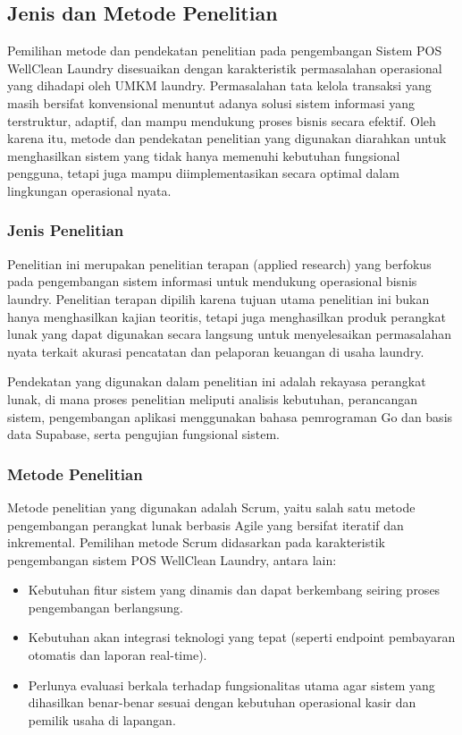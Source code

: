 
\vspace{1cm}
\subsection{Jenis dan Metode Penelitian}
\indent
Pemilihan metode dan pendekatan penelitian pada pengembangan Sistem POS WellClean Laundry disesuaikan dengan karakteristik permasalahan operasional yang dihadapi oleh UMKM laundry. Permasalahan tata kelola transaksi yang masih bersifat konvensional menuntut adanya solusi sistem informasi yang terstruktur, adaptif, dan mampu mendukung proses bisnis secara efektif. Oleh karena itu, metode dan pendekatan penelitian yang digunakan diarahkan untuk menghasilkan sistem yang tidak hanya memenuhi kebutuhan fungsional pengguna, tetapi juga mampu diimplementasikan secara optimal dalam lingkungan operasional nyata.

\subsubsection{Jenis Penelitian}
\indent
Penelitian ini merupakan penelitian terapan (applied research) yang berfokus pada pengembangan sistem informasi untuk mendukung operasional bisnis laundry. Penelitian terapan dipilih karena tujuan utama penelitian ini bukan hanya menghasilkan kajian teoritis, tetapi juga menghasilkan produk perangkat lunak yang dapat digunakan secara langsung untuk menyelesaikan permasalahan nyata terkait akurasi pencatatan dan pelaporan keuangan di usaha laundry.

Pendekatan yang digunakan dalam penelitian ini adalah rekayasa perangkat lunak, di mana proses penelitian meliputi analisis kebutuhan, perancangan sistem, pengembangan aplikasi menggunakan bahasa pemrograman Go dan basis data Supabase, serta pengujian fungsional sistem.


\subsubsection{Metode Penelitian}
\indent
Metode penelitian yang digunakan adalah Scrum, yaitu salah satu metode pengembangan perangkat lunak berbasis Agile yang bersifat iteratif dan inkremental. Pemilihan metode Scrum didasarkan pada karakteristik pengembangan sistem POS WellClean Laundry, antara lain:

\begin{itemize}
    \item Kebutuhan fitur sistem yang dinamis dan dapat berkembang seiring proses pengembangan berlangsung.
    \item Kebutuhan akan integrasi teknologi yang tepat (seperti endpoint pembayaran otomatis dan laporan real-time).
    \item Perlunya evaluasi berkala terhadap fungsionalitas utama agar sistem yang dihasilkan benar-benar sesuai dengan kebutuhan operasional kasir dan pemilik usaha di lapangan.
\end{itemize}

